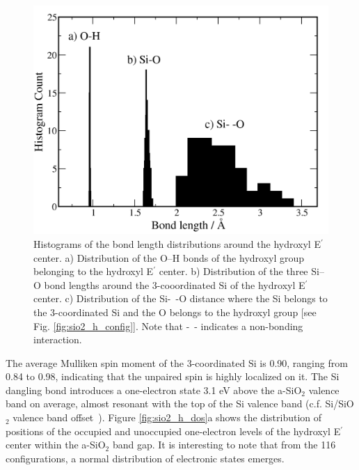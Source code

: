 \documentclass[aps,prb,reprint,superscriptaddress,showpacs]{revtex4-1}
\begin{document}
\begin{figure}
\includegraphics{hydroxyl_eprime_distribution.png}
\caption{Histograms of the bond length distributions around the hydroxyl E$^\prime$ center. a) Distribution of the \mbox{O--H} bonds of the hydroxyl group belonging to the hydroxyl E$^\prime$ center. b) Distribution of the three \mbox{Si--O} bond lengths around the 3-cooordinated Si of the hydroxyl E$^\prime$ center. c) Distribution of the \mbox{Si- -O} distance where the Si belongs to the 3-coordinated Si and the O belongs to the hydroxyl group [see Fig. \ref{fig:sio2_h_config}]. Note that \mbox{- -} indicates a non-bonding interaction. }
\label{fig:hydroxyl_geometry}
\end{figure}

The average Mulliken spin moment of the 3-coordinated Si is 0.90, ranging from 0.84 to 0.98, indicating that the unpaired spin is highly localized on it. The Si dangling bond introduces a one-electron state 3.1 eV above the a-SiO$_2$ valence band on average, almost resonant with the top of the Si valence band (c.f. Si/SiO$_2$ valence band offset~\cite{sisio2_vb_offset}). Figure \ref{fig:sio2_h_dos}a shows the distribution of positions of the occupied and unoccupied one-electron levels of the hydroxyl E$^\prime$ center within the a-SiO$_2$ band gap. It is interesting to note that from the 116 configurations, a normal distribution of electronic states emerges. 
\end{document}
